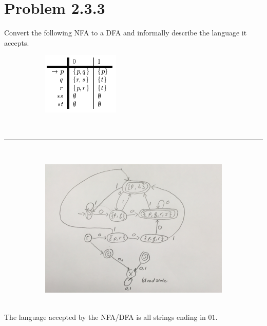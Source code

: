 \documentclass[20pt]{article} %
\begin{document}
\section{Problem 2.3.3}
Convert the following NFA to a DFA and informally describe the language it accepts. 
\begin{figure}[!htbp]
  	\centering
   	\begin{subfigure}[p]{0.25\linewidth}
    	\includegraphics[width=\linewidth]{./figures/HW2fig2.png}
   	\end{subfigure}
\end{figure} \\
\noindent\rule{2cm}{0.4pt} \\
\begin{figure}[!htbp]
  	\centering
   	\begin{subfigure}[p]{0.95\linewidth}
    	\includegraphics[width=\linewidth]{./figures/h2-2.jpg}
   	\end{subfigure}
\end{figure} \\
The language accepted by the NFA/DFA is all strings ending in $01$.
\end{document}
